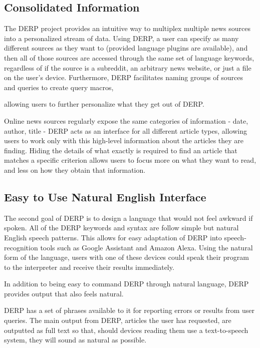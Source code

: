 \documentclass{article}
\begin{document}
\subsection{Consolidated Information}
The DERP project provides an intuitive way to multiplex multiple news sources into a personalized stream of data. Using DERP, a user can specify as many different sources as they want to (provided language plugins are available), and then all of those sources are accessed through the same set of language keywords, regardless of if the source is a subreddit, an arbitrary news website, or just a file on the user's device. Furthermore, DERP facilitates naming groups of sources and queries to create query macros,
\begin{comment}
@ADS Did we actually decide on if we want savable sets of instructions other than in the form of a DERP program? (Can a program create another program?)
\end{comment}
allowing users to further personalize what they get out of DERP.

Online news sources regularly expose the same categories of information - date, author, title - DERP acts as an interface for all different article types, allowing users to work only with this high-level information about the articles they are finding. Hiding the details of what exactly is required to find an article that matches a specific criterion allows users to focus more on what they want to read, and less on how they obtain that information.

\subsection{Easy to Use Natural English Interface}
The second goal of DERP is to design a language that would not feel awkward if spoken. All of the DERP keywords and syntax are follow simple but natural English speech patterns. This allows for easy adaptation of DERP into speech-recognition tools such as Google Assistant and Amazon Alexa. Using the natural form of the language, users with one of these devices could speak their program to the interpreter and receive their results immediately.

In addition to being easy to command DERP through natural language, DERP provides output that also feels natural.
\begin{comment}
@ADS - Is this something we're actually doing? We've kind of had it implied
in discussions, but never explicitly talked about it
\end{comment}
DERP has a set of phrases available to it for reporting errors or results from user queries. The main output from DERP, articles the user has requested, are outputted as full text so that, should devices reading them use a text-to-speech system, they will sound as natural as possible.
\end{document}
